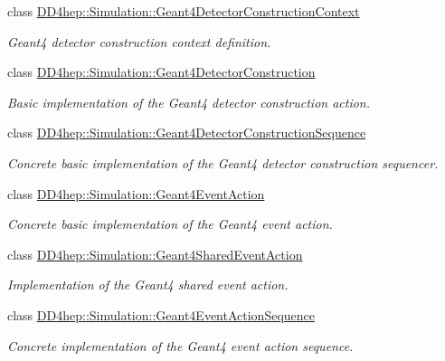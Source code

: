 \begin{DoxyCompactItemize}
class \hyperlink{class_d_d4hep_1_1_simulation_1_1_geant4_detector_construction_context}{DD4hep::Simulation::Geant4DetectorConstructionContext}
\begin{DoxyCompactList}\small\item\em Geant4 detector construction context definition. \item\end{DoxyCompactList}\item 
class \hyperlink{class_d_d4hep_1_1_simulation_1_1_geant4_detector_construction}{DD4hep::Simulation::Geant4DetectorConstruction}
\begin{DoxyCompactList}\small\item\em Basic implementation of the Geant4 detector construction action. \item\end{DoxyCompactList}\item 
class \hyperlink{class_d_d4hep_1_1_simulation_1_1_geant4_detector_construction_sequence}{DD4hep::Simulation::Geant4DetectorConstructionSequence}
\begin{DoxyCompactList}\small\item\em Concrete basic implementation of the Geant4 detector construction sequencer. \item\end{DoxyCompactList}\item 
class \hyperlink{class_d_d4hep_1_1_simulation_1_1_geant4_event_action}{DD4hep::Simulation::Geant4EventAction}
\begin{DoxyCompactList}\small\item\em Concrete basic implementation of the Geant4 event action. \item\end{DoxyCompactList}\item 
class \hyperlink{class_d_d4hep_1_1_simulation_1_1_geant4_shared_event_action}{DD4hep::Simulation::Geant4SharedEventAction}
\begin{DoxyCompactList}\small\item\em Implementation of the Geant4 shared event action. \item\end{DoxyCompactList}\item 
class \hyperlink{class_d_d4hep_1_1_simulation_1_1_geant4_event_action_sequence}{DD4hep::Simulation::Geant4EventActionSequence}
\begin{DoxyCompactList}\small\item\em Concrete implementation of the Geant4 event action sequence. \item\end{DoxyCompactList}\item 

\end{DoxyCompactItemize}
